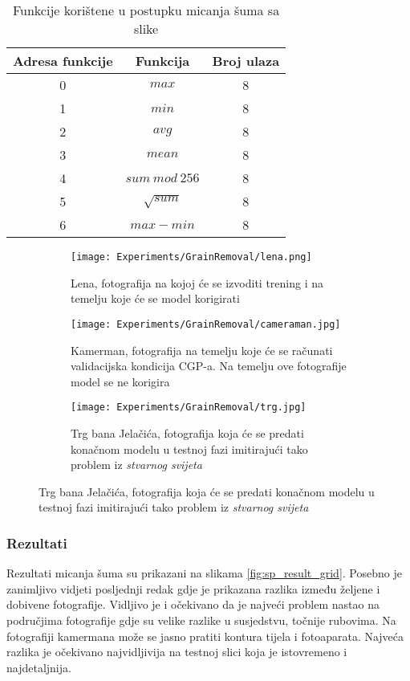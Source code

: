 \begin{table}
	\centering
	\begin{tabular}{||c c c||}
		\hline
		Adresa funkcije & Funkcija & Broj ulaza \\ [0.5ex]
		\hline \hline
		0 & $max$ & 8 \\
		1 & $min$ & 8 \\ 
		2 & $avg$ & 8 \\ 
		3 & $mean$ & 8 \\ 
		4 & $sum\ mod\ 256$ & 8 \\ 
		5 & $\sqrt{sum}$ & 8 \\ 
		6 & $max - min$ & 8 \\ [1ex]
		\hline
	\end{tabular}
	\caption{Funkcije korištene u postupku micanja šuma sa slike}
	\label{table:sp_function_set}
\end{table}

\begin{figure}
	\caption{Fotografije na koje će biti primjenjen šum korištene u trening, validacijskoj i testnoj fazi}
	\begin{subfigure}[t]{0.45\textwidth}
		\texttt{[image: Experiments/GrainRemoval/lena.png]}
		\caption{Lena, fotografija na kojoj će se izvoditi trening i na temelju koje će se model korigirati}
		\label{fig:sp_train_sample}
	\end{subfigure}
	\begin{subfigure}[t]{0.45\textwidth}
		\texttt{[image: Experiments/GrainRemoval/cameraman.jpg]}
		\caption{Kamerman, fotografija na temelju koje će se računati validacijska kondicija CGP-a. Na temelju ove fotografije model se ne korigira}
		\label{fig:sp_val_sample}
	\end{subfigure}
	\begin{subfigure}[t]{0.45\textwidth}
		\texttt{[image: Experiments/GrainRemoval/trg.jpg]}
		\caption{Trg bana Jelačića, fotografija koja će se predati konačnom modelu u testnoj fazi imitirajući tako problem iz \emph{stvarnog svijeta}}
		\label{fig:sp_test_sample}
	\end{subfigure}
	\label{fig:sp_samples}
\end{figure}

\subsubsection{Rezultati}
Rezultati micanja šuma su prikazani na slikama \ref{fig:sp_result_grid}.
Posebno je zanimljivo vidjeti posljednji redak gdje je prikazana razlika između željene i dobivene fotografije.
Vidljivo je i očekivano da je najveći problem nastao na područjima fotografije gdje su velike razlike u susjedstvu, točnije rubovima.
Na fotografiji kamermana može se jasno pratiti kontura tijela i fotoaparata.
Najveća razlika je očekivano najvidljivija na testnoj slici koja je istovremeno i najdetaljnija.

